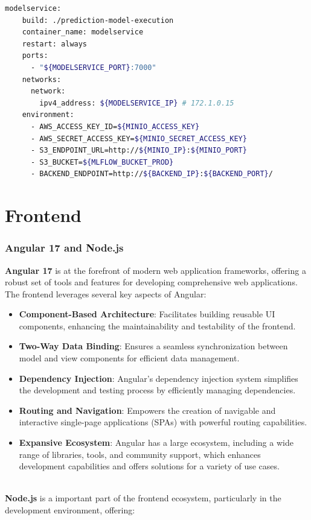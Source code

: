 \begin{lstlisting}[language=bash, caption=Model Service Docker Compose, label={lst:model_service_docker_compose}]
modelservice: 
    build: ./prediction-model-execution
    container_name: modelservice
    restart: always
    ports:
      - "${MODELSERVICE_PORT}:7000"
    networks:
      network:
        ipv4_address: ${MODELSERVICE_IP} # 172.1.0.15
    environment:
      - AWS_ACCESS_KEY_ID=${MINIO_ACCESS_KEY}
      - AWS_SECRET_ACCESS_KEY=${MINIO_SECRET_ACCESS_KEY}
      - S3_ENDPOINT_URL=http://${MINIO_IP}:${MINIO_PORT}
      - S3_BUCKET=${MLFLOW_BUCKET_PROD}
      - BACKEND_ENDPOINT=http://${BACKEND_IP}:${BACKEND_PORT}/
\end{lstlisting}

\section{Frontend}


\subsubsection{Angular 17 and Node.js}
\textbf{Angular 17} is at the forefront of modern web application frameworks, offering a robust set of tools and features for developing comprehensive web applications. The frontend leverages several key aspects of Angular:

\begin{itemize}
    \item \textbf{Component-Based Architecture}: Facilitates building reusable UI components, enhancing the maintainability and testability of the frontend.
    \item \textbf{Two-Way Data Binding}: Ensures a seamless synchronization between model and view components for efficient data management.
    \item \textbf{Dependency Injection}: Angular's dependency injection system simplifies the development and testing process by efficiently managing dependencies.
    \item \textbf{Routing and Navigation}: Empowers the creation of navigable and interactive single-page applications (SPAs) with powerful routing capabilities.
    \item \textbf{Expansive Ecosystem}: Angular has a large ecosystem, including a wide range of libraries, tools, and community support, which enhances development capabilities and offers solutions for a variety of use cases.
\end{itemize}
\mbox{}\\
\textbf{Node.js} is a important part of the frontend ecosystem, particularly in the development environment, offering:

